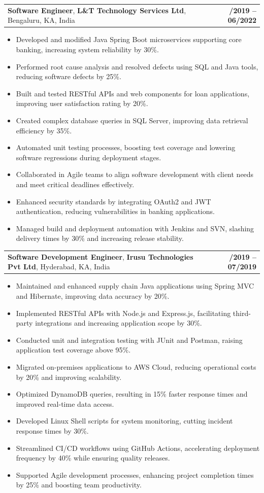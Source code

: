 \documentclass[letterpaper,11pt]{article}
\makeatletter
\newcommand{\resumeItem}[1]{
  \item\footnotesize{
    {#1 \vspace{-2pt}}
  }
}
\newcommand{\resumeSubheading}[4]{
  \vspace{-2pt}\item
    \begin{tabular*}{1.0\textwidth}[t]{l@{\extracolsep{\fill}}r}
      \textbf{\fontsize{10pt}{14pt}\selectfont #3}, \textbf{\fontsize{10pt}{14pt}\selectfont #1}, \fontsize{10pt}{14pt}\selectfont #4 & \textbf{\fontsize{10pt}{14pt}\selectfont #2} \\
    \end{tabular*}\vspace{-7pt}
}
\newcommand{\resumeItemListStart}{\begin{itemize}[leftmargin=*]}
\newcommand{\resumeItemListEnd}{\end{itemize}\vspace{-5pt}}
\makeatother
\begin{document}
    \resumeSubheading
        {L\&T Technology Services Ltd}{08/2019 -- 06/2022}
        {Software Engineer}{Bengaluru, KA, India}
      \resumeItemListStart
        \resumeItem{Developed and modified Java Spring Boot microservices supporting core banking, increasing system reliability by 30\%.}
        \resumeItem{Performed root cause analysis and resolved defects using SQL and Java tools, reducing software defects by 25\%.}
        \resumeItem{Built and tested RESTful APIs and web components for loan applications, improving user satisfaction rating by 20\%.}
        \resumeItem{Created complex database queries in SQL Server, improving data retrieval efficiency by 35\%.}
        \resumeItem{Automated unit testing processes, boosting test coverage and lowering software regressions during deployment stages.}
        \resumeItem{Collaborated in Agile teams to align software development with client needs and meet critical deadlines effectively.}
        \resumeItem{Enhanced security standards by integrating OAuth2 and JWT authentication, reducing vulnerabilities in banking applications.}
        \resumeItem{Managed build and deployment automation with Jenkins and SVN, slashing delivery times by 30\% and increasing release stability.}
      \resumeItemListEnd

    \resumeSubheading
        {Irusu Technologies Pvt Ltd}{01/2019 -- 07/2019}
        {Software Development Engineer}{Hyderabad, KA, India}
      \resumeItemListStart
        \resumeItem{Maintained and enhanced supply chain Java applications using Spring MVC and Hibernate, improving data accuracy by 20\%.}
        \resumeItem{Implemented RESTful APIs with Node.js and Express.js, facilitating third-party integrations and increasing application scope by 30\%.}
        \resumeItem{Conducted unit and integration testing with JUnit and Postman, raising application test coverage above 95\%.}
        \resumeItem{Migrated on-premises applications to AWS Cloud, reducing operational costs by 20\% and improving scalability.}
        \resumeItem{Optimized DynamoDB queries, resulting in 15\% faster response times and improved real-time data access.}
        \resumeItem{Developed Linux Shell scripts for system monitoring, cutting incident response times by 30\%.}
        \resumeItem{Streamlined CI/CD workflows using GitHub Actions, accelerating deployment frequency by 40\% while ensuring quality releases.}
        \resumeItem{Supported Agile development processes, enhancing project completion times by 25\% and boosting team productivity.}
      \resumeItemListEnd
\end{document}
